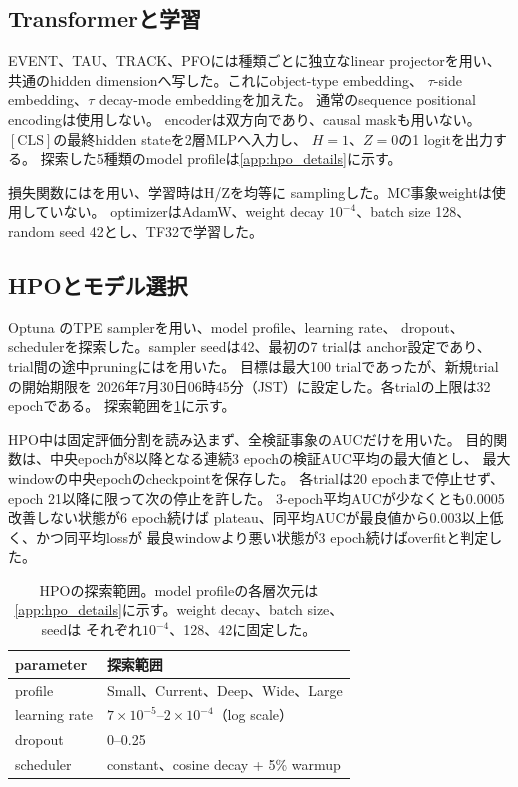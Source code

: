 \documentclass[xelatex,ja=standard,a4paper,10pt,twocolumn]{bxjsarticle}
\begin{document}
\subsection{Transformerと学習}

EVENT、TAU、TRACK、PFOには種類ごとに独立なlinear projectorを用い、
共通のhidden dimensionへ写した。これにobject-type embedding、
\(\tau\)-side embedding、\(\tau\) decay-mode embeddingを加えた。
通常のsequence positional encodingは使用しない。
encoderは双方向であり、causal maskも用いない。
\([\mathrm{CLS}]\)の最終hidden stateを2層MLPへ入力し、
\(H=1\)、\(Z=0\)の1 logitを出力する。
探索した5種類のmodel profileは\cref{app:hpo_details}に示す。

損失関数にはを用い、学習時はH/Zを均等に
samplingした。MC事象weightは使用していない。
optimizerはAdamW、weight decay \(10^{-4}\)、batch size 128、
random seed 42とし、TF32で学習した。

\subsection{HPOとモデル選択}
\label{subsec:model_selection}

Optuna \cite{Optuna}のTPE samplerを用い、model profile、learning rate、
dropout、schedulerを探索した。sampler seedは42、最初の7 trialは
anchor設定であり、trial間の途中pruningにはを用いた。
目標は最大100 trialであったが、新規trialの開始期限を
2026年7月30日06時45分（JST）に設定した。各trialの上限は32 epochである。
探索範囲を\cref{tab:hpo_space}に示す。

HPO中は固定評価分割を読み込まず、全検証事象のAUCだけを用いた。
目的関数は、中央epochが8以降となる連続3 epochの検証AUC平均の最大値とし、
最大windowの中央epochのcheckpointを保存した。
各trialは20 epochまで停止せず、epoch 21以降に限って次の停止を許した。
3-epoch平均AUCが少なくとも0.0005改善しない状態が6 epoch続けば
plateau、同平均AUCが最良値から0.003以上低く、かつ同平均lossが
最良windowより悪い状態が3 epoch続けばoverfitと判定した。

\begin{table}[t]
  \centering
  \caption{HPOの探索範囲。model profileの各層次元は
    \cref{app:hpo_details}に示す。weight decay、batch size、seedは
    それぞれ\(10^{-4}\)、128、42に固定した。}
  \label{tab:hpo_space}
  \small
  \begin{tabularx}{\columnwidth}{@{}l X@{}}
    \toprule
    parameter & 探索範囲 \\
    \midrule
    profile & Small、Current、Deep、Wide、Large \\
    learning rate & \(7\times10^{-5}\)--\(2\times10^{-4}\)（log scale） \\
    dropout & 0--0.25 \\
    scheduler & constant、cosine decay + 5\% warmup \\
    \bottomrule
  \end{tabularx}
\end{table}
\end{document}

